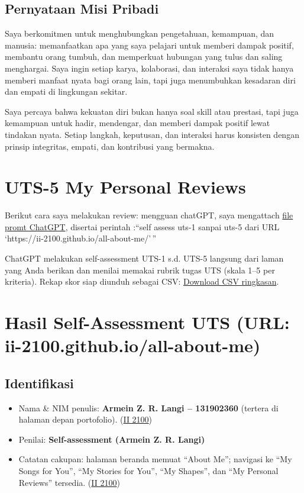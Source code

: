 \documentclass[
  letterpaper,
  DIV=11,
  numbers=noendperiod]{scrreprt}
\providecommand{\tightlist}{%
  \setlength{\itemsep}{0pt}\setlength{\parskip}{0pt}}
\begin{document}
\section{Pernyataan Misi Pribadi}\label{pernyataan-misi-pribadi}

Saya berkomitmen untuk menghubungkan pengetahuan, kemampuan, dan
manusia: memanfaatkan apa yang saya pelajari untuk memberi dampak
positif, membantu orang tumbuh, dan memperkuat hubungan yang tulus dan
saling menghargai. Saya ingin setiap karya, kolaborasi, dan interaksi
saya tidak hanya memberi manfaat nyata bagi orang lain, tapi juga
menumbuhkan kesadaran diri dan empati di lingkungan sekitar.

Saya percaya bahwa kekuatan diri bukan hanya soal skill atau prestasi,
tapi juga kemampuan untuk hadir, mendengar, dan memberi dampak positif
lewat tindakan nyata. Setiap langkah, keputusan, dan interaksi harus
konsisten dengan prinsip integritas, empati, dan kontribusi yang
bermakna.


\chapter{UTS-5 My Personal Reviews}\label{uts-5-my-personal-reviews}

Berikut cara saya melakukan review: mengguan chatGPT, saya mengattach
\href{skor_uts.pdf}{file promt ChatGPT}, disertai perintah :``self
assess uts-1 sanpai uts-5 dari URL
`https://ii-2100.github.io/all-about-me/'\,''

ChatGPT melakukan self-assessment UTS-1 s.d. UTS-5 langsung dari laman
yang Anda berikan dan menilai memakai rubrik tugas UTS (skala 1--5 per
kriteria). Rekap skor siap diunduh sebagai CSV:
\href{sandbox:/mnt/data/UTS_self_assessment.csv}{Download CSV
ringkasan}.


\chapter{Hasil Self-Assessment UTS (URL:
ii-2100.github.io/all-about-me)}\label{hasil-self-assessment-uts-url-ii-2100.github.ioall-about-me}

\section{Identifikasi}\label{identifikasi}

\begin{itemize}
\tightlist
\item
  Nama \& NIM penulis: \textbf{Armein Z. R. Langi -- 131902360} (tertera
  di halaman depan portofolio).
  (\href{https://ii-2100.github.io/all-about-me/}{II 2100})
\item
  Penilai: \textbf{Self-assessment (Armein Z. R. Langi)}
\item
  Catatan cakupan: halaman beranda memuat ``About Me''; navigasi ke ``My
  Songs for You'', ``My Stories for You'', ``My Shapes'', dan ``My
  Personal Reviews'' tersedia.
  (\href{https://ii-2100.github.io/all-about-me/}{II 2100})
\end{itemize}
\end{document}
